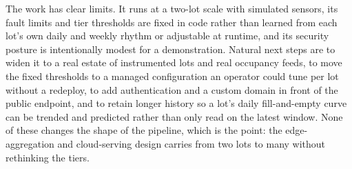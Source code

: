 \documentclass[conference]{IEEEtran}
\begin{document}
The work has clear limits. It runs at a two-lot scale with simulated sensors, its fault limits and tier thresholds are fixed in code rather than learned from each lot's own daily and weekly rhythm or adjustable at runtime, and its security posture is intentionally modest for a demonstration. Natural next steps are to widen it to a real estate of instrumented lots and real occupancy feeds, to move the fixed thresholds to a managed configuration an operator could tune per lot without a redeploy, to add authentication and a custom domain in front of the public endpoint, and to retain longer history so a lot's daily fill-and-empty curve can be trended and predicted rather than only read on the latest window. None of these changes the shape of the pipeline, which is the point: the edge-aggregation and cloud-serving design carries from two lots to many without rethinking the tiers.
\end{document}

